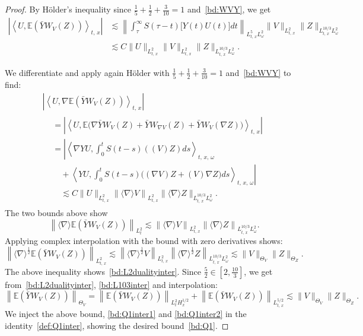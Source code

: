 \documentclass[AHL, Unicode, longabstracts,published]{cedram}
\newcommand{\E}{\mathbb{E}}
\begin{document}
\begin{proof}
By H\"older's inequality since $\tfrac 15+\tfrac 12+\tfrac{3}{10}=1$ and~\eqref{bd:WVY}, we get
\begin{align*}
\left|\left\langle U, \E\left(\bar Y W_V(Z)\right)\right\rangle_{t,\,x}\right| &\lesssim \left\|\int_{\tau}^\infty S(\tau - t)\big[Y(t)U(t)\big]dt\right\|_{L^5_{t,\,x} L^2_\omega}\|V\|_{L^2_{t,\,x}} \|Z\|_{L^{10/3}_{t,\,x} L^2_\omega}\\
&\lesssim C\|U\|_{L^2_{t,\,x}}\|V\|_{L^2_{t,\,x}} \|Z\|_{L^{10/3}_{t,\,x} L^2_\omega}.
\end{align*}

We differentiate and apply again H\"older with $\tfrac 15+\tfrac 12+\tfrac{3}{10}=1$ and~\eqref{bd:WVY} to find:
\begin{multline*}
\left|\left\langle U, \nabla \E\left(\bar Y W_V(Z)\right)\right\rangle_{t,\,x}\right| \\
\begin{aligned}
&=\left| \left\langle U, \E\big(\nabla \bar Y W_V(Z)+\bar Y W_{\nabla V}(Z)+\bar Y W_{V}(\nabla Z)\big)\right\rangle_{t,\,x}\right| \\
&=\left| \left\langle \nabla YU,\int_0^t S(t-s)((V)Z)ds\right\rangle_{t,\,x,\,\omega}\right.\\
&\left.\quad+\left\langle YU,\int_0^t S(t-s)\big((\nabla V)Z+(V)\nabla Z\big)ds\right\rangle_{t,\,x,\,\omega}\right|\\
&\quad\lesssim C\|U\|_{L^2_{t,\,x}}\left\| \langle \nabla \rangle V\right\|_{L^2_{t,\,x}} \|\langle \nabla \rangle Z\|_{L^{10/3}_{t,\,x} L^2_\omega}.
\end{aligned}
\end{multline*}
The two bounds above show
\[
\left\| \langle \nabla \rangle \E\left(\bar Y W_V(Z)\right)\right\|_{L^2_t}\lesssim \left\| \langle \nabla \rangle V\right\|_{L^2_{t,\,x}} \left\|\langle \nabla \rangle Z\right\|_{L^{10/3}_{t,\,x} L^2_\omega}.
\]
Applying complex interpolation with the bound with zero derivatives shows:
\[
\left\| \langle \nabla \rangle^{\frac 12}\E\left(\bar Y W_V(Z)\right)\right\|_{L^2_{t,\,x}}\lesssim \left\| \langle \nabla \rangle^{\frac 12}V\right\|_{L^2_{t,\,x}} \left\| \langle \nabla \rangle^{\frac 12} Z\right\|_{L^{10/3}_{t,\,x} L^2_\omega}\lesssim \| V \|_{\Theta_V}\| Z \|_{\Theta_Z}.
\]
The above inequality shows~\eqref{bd:L2dualityinter}. Since $\tfrac52 \in [2,\tfrac{10}{3}]$, we get from~\eqref{bd:L2dualityinter}, \eqref{bd:L103inter} and interpolation:
\[
\left\| \E\left(\bar Y W_V(Z)\right)\right\|_{\Theta_V}=
\left\| \E\left(\bar Y W_V(Z)\right)\right\|_{L^2_{t}H^{1/2}_x}+\left\| \E\left(\bar Y W_V(Z)\right)\right\|_{L^{5/2}_{t,\,x}} \lesssim \|V\|_{\Theta_V} \|Z\|_{\Theta_Z}.
\]
We inject the above bound, \eqref{bd:Q1inter1} and \eqref{bd:Q1inter2} in the identity~\eqref{def:Q1inter}, showing the desired bound~\eqref{bd:Q1}.
\end{proof}
\end{document}
